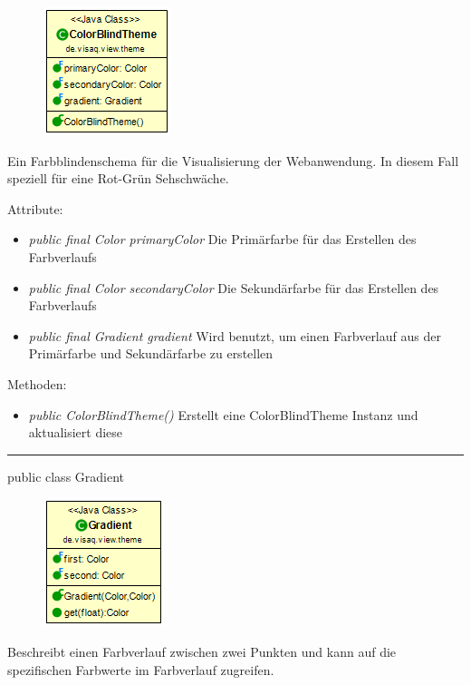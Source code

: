 \begin{minipage}{0.3\textwidth}
\begin{figure}[H]
    \includegraphics[scale = 0.5]{media/frontend/view/de.view.elements.theme/ColorBlindTheme_Class.png}
\end{figure}
\end{minipage} \hfill
\begin{minipage}{0.6\textwidth}
    Ein Farbblindenschema für die Visualisierung der Webanwendung. In diesem Fall speziell für eine Rot-Grün Sehschwäche.
\end{minipage}

Attribute:
\begin{itemize}
    \item \emph{public final Color primaryColor} Die Primärfarbe für das Erstellen des Farbverlaufs
    \item \emph{public final Color secondaryColor} Die Sekundärfarbe für das Erstellen des Farbverlaufs
    \item \emph{public final Gradient gradient} Wird benutzt, um einen Farbverlauf aus der Primärfarbe und Sekundärfarbe zu erstellen
\end{itemize}
Methoden:
\begin{itemize} 
    \item \emph{public ColorBlindTheme()} Erstellt eine ColorBlindTheme Instanz und aktualisiert diese
\end{itemize}

\rule{\textwidth}{0.4pt}
public class Gradient

\begin{minipage}{0.3\textwidth}
    \begin{figure}[H]
    \includegraphics[scale = 0.5]{media/frontend/view/de.view.elements.theme/Gradient_Class.png}
    \end{figure}
    \end{minipage} \hfill
    \begin{minipage}{0.6\textwidth}
    Beschreibt einen Farbverlauf zwischen zwei Punkten und kann auf die spezifischen Farbwerte im Farbverlauf zugreifen.
    \end{minipage}

